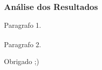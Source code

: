 
\begin{frame}
\frametitle{Análise dos Resultados}
Paragrafo 1.
\\~\\
Paragrafo 2.
\end{frame}


\begin{frame}
\Huge{\centerline{Obrigado ;)}}
\end{frame}


